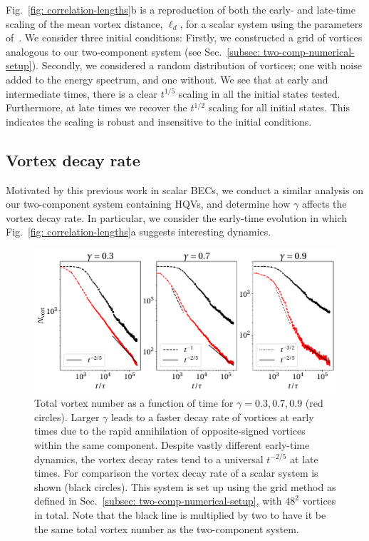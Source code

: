 Fig.~\ref{fig: correlation-lengths}b is a reproduction of both the early- and
late-time scaling of the mean vortex distance, \(\ell_d\), for a scalar system
using the parameters of~\cite{Karl2017}.
We consider three initial conditions: Firstly, we constructed a grid of vortices
analogous to our two-component system (see
Sec.~\ref{subsec: two-comp-numerical-setup}).
Secondly, we considered a random distribution of vortices; one with noise
added to the energy spectrum, and one without.
We see that at early and intermediate times, there is a clear \(t^{1/5}\)
scaling in all the initial states tested.
Furthermore, at late times we recover the \(t^{1/2}\) scaling for all initial
states.
This indicates the scaling is robust and insensitive to the initial conditions.

\subsection{Vortex decay rate}
Motivated by this previous work in scalar BECs, we conduct a similar analysis
on our two-component system containing HQVs, and determine how \(\gamma \)
affects the vortex decay rate.
In particular, we consider the early-time evolution in which
Fig.~\ref{fig: correlation-lengths}a suggests interesting dynamics.
\begin{figure}
    \centering
    \includegraphics[width=\textwidth]{gfx/ch-twoCompDynamics/vortex_number.pdf}
    \caption[Vortex decay as a function of time for a system of HQVs for
    different \(\gamma \)]
    {\label{fig: vortex-number}Total vortex number as a function of time for
        \(\gamma=0.3,0.7,0.9\) (red circles).
        Larger \(\gamma \) leads to a faster decay rate of vortices at
        early times due to the rapid annihilation of opposite-signed vortices
        within the same component.
        Despite vastly different early-time dynamics, the vortex decay rates
        tend to a universal \(t^{-2/5}\) at late times.
        For comparison the vortex decay rate of a scalar system is shown
        (black circles).
        This system is set up using the grid method as defined in
        Sec.~\ref{subsec: two-comp-numerical-setup}, with \(48^2\) vortices in
        total.
        Note that the black line is multiplied by two to have it be the same
        total vortex number as the two-component system.
    }
\end{figure}
